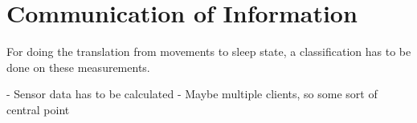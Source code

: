 
\section{Communication of Information} %
\label{sec:communicating_relevant_information}
For doing the translation from movements to sleep state, a classification has to be done on these measurements.

- Sensor data has to be calculated
- Maybe multiple clients, so some sort of central point

